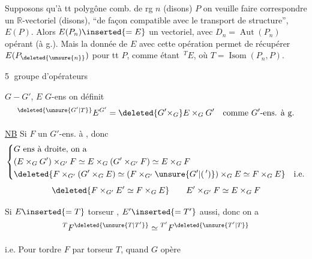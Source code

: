 Supposons qu'à tt polygône comb. de rg $n$ (disons) $P$ on veuille faire correspondre un $\mathbb{R}$-vectoriel  (disons), ``de façon compatible avec le transport de structure'',   $E(P)$. Alors $E(P_n)\inserted{=E}$  un vectoriel, avec $D_n=\operatorname{Aut}(P_n)$ opérant (à g.). Mais la donnée de $E$ avec cette opération permet de récupérer $E(P_{\deleted{\unsure{n}}})$ pour tt $P$, comme étant  $\,{}^TE$, où $T=\operatorname{Isom}(P_n,P)$.

\textcircled{5}  groupe d'opérateurs

$G\mathrel{-}G'$, $E$ $G$-ens \unsure{,} on définit
\[
 {}^{\deleted{\unsure{G'|T}}}E^{G'}=\deleted{G'\times_G}E\times_G G'
 \quad\text{comme $G'$-ens. à g.}
\]

\uline{NB} Si $F$ un $G'$-ens. à , donc
\[
\left\{\begin{aligned}
 &G\text{ ens à droite, on a}\\
 &(E\times_G G')\times_{G'}F\simeq E\times_G(G'\times_{G'}F)\simeq E\times_G F\\
 &\deleted{F\times_{G'}(G'\times_G E)\simeq(F\times_{G'}\unsure{G'|(\,')})\times_G E\simeq F\times_G E}\quad\text{i.e.}
\end{aligned}\right.
\]
\[
 \deleted{F\times_{G'}E'\simeq F\times_G E}\qquad E'\times_{G'}F\simeq E\times_G F
\]

Si $E\inserted{=T}$ torseur , $E'\inserted{=T'}$ aussi, donc on a
\[
 {}^{T}F^{\deleted{\unsure{T|T'}}}\simeq{}^{T'}F^{\deleted{\unsure{T'|T}}}
\]

i.e. Pour tordre $F$ par torseur $T$, quand $G$ opère
